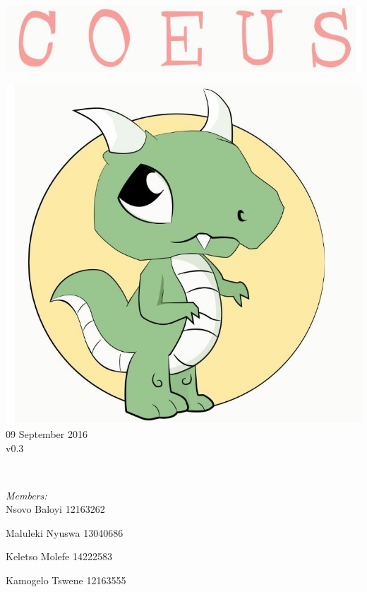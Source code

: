 \documentclass[a4paper,12pt]{article}
\begin{document}
\begin{titlepage}
	\includegraphics[width=\textwidth]{../name} \\[1cm]
	\begin{minipage}{0.4\textwidth}
	\begin{flushleft} \large
	\includegraphics[width=\textwidth]{../logo} \\[0.5cm]
	{\large 09 September 2016}\\
	{\large v0.3}
	\end{flushleft}
	\end{minipage}
	~
	\begin{minipage}{0.5\textwidth}
	\begin{flushright} \large
	\emph{Members:}\\%
	Nsovo Baloyi 12163262

	Maluleki Nyuswa 13040686
	
	Keletso Molefe 14222583
	
	Kamogelo Tswene 12163555

	\end{flushright}
	\end{minipage}\\[4cm]
\end{titlepage}
\end{document}
